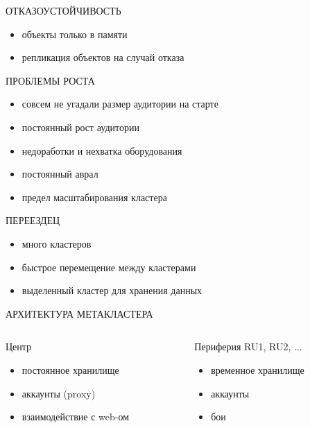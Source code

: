 \documentclass[aspectratio=169]{beamer}
\begin{document}
\begin{frame}{ОТКАЗОУСТОЙЧИВОСТЬ}
    \begin{itemize}
        \item объекты только в памяти
        \item репликация объектов на случай отказа
    \end{itemize}
\end{frame}

\begin{frame}{ПРОБЛЕМЫ РОСТА}
    \begin{itemize}
    \item совсем не угадали размер аудитории на старте
    \item постоянный рост аудитории
    \item недоработки и нехватка оборудования
    \item постоянный аврал
    \item предел масштабирования кластера
    \end{itemize}
\end{frame}

\begin{frame}{ПЕРЕЕЗДЕЦ}
    \begin{itemize}
        \item много кластеров
        \item быстрое перемещение между кластерами
        \item выделенный кластер для хранения данных
    \end{itemize}
\end{frame}

\begin{frame}{АРХИТЕКТУРА МЕТАКЛАСТЕРА}
    \begin{columns}

    \begin{column}{0.5\textwidth}
    \begin{block}{Центр}
        \begin{itemize}
            \item постоянное хранилище
            \item аккаунты (proxy)
            \item взаимодействие с web-ом
        \end{itemize}
    \end{block}
    \end{column}
    
    \begin{column}{0.5\textwidth}
    \begin{block}{Периферия RU1, RU2, ...}
        \begin{itemize}
            \item временное хранилище
            \item аккаунты
            \item бои
        \end{itemize}
    \end{block}
    \end{column}

    \end{columns}
\end{frame}
\end{document}
